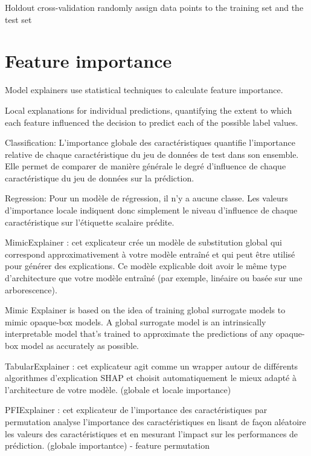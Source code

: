 \documentclass[11pt, onecolumn]{article}
\begin{document}
Holdout cross-validation
randomly assign data points to the training set and the test set



\section{Feature importance}

Model explainers use statistical techniques to calculate feature importance.

Local explanations for individual predictions, quantifying the extent to which each feature influenced the decision to predict each of the possible label values.

Classification:
L’importance globale des caractéristiques quantifie l’importance relative de chaque caractéristique du jeu de données de test dans son ensemble. Elle permet de comparer de manière générale le degré d’influence de chaque caractéristique du jeu de données sur la prédiction.

Regression: 
Pour un modèle de régression, il n’y a aucune classe. Les valeurs d’importance locale indiquent donc simplement le niveau d’influence de chaque caractéristique sur l’étiquette scalaire prédite.

MimicExplainer : cet explicateur crée un modèle de substitution global qui correspond approximativement à votre modèle entraîné et qui peut être utilisé pour générer des explications. Ce modèle explicable doit avoir le même type d’architecture que votre modèle entraîné (par exemple, linéaire ou basée sur une arborescence).

Mimic Explainer is based on the idea of training global surrogate models to mimic opaque-box models. A global surrogate model is an intrinsically interpretable model that's trained to approximate the predictions of any opaque-box model as accurately as possible.


TabularExplainer : cet explicateur agit comme un wrapper autour de différents algorithmes d’explication SHAP et choisit automatiquement le mieux adapté à l’architecture de votre modèle. (globale et locale importance)

PFIExplainer : cet explicateur de l’importance des caractéristiques par permutation analyse l’importance des caractéristiques en lisant de façon aléatoire les valeurs des caractéristiques et en mesurant l’impact sur les performances de prédiction. (globale importantce)
	- feature permutation
\end{document}
